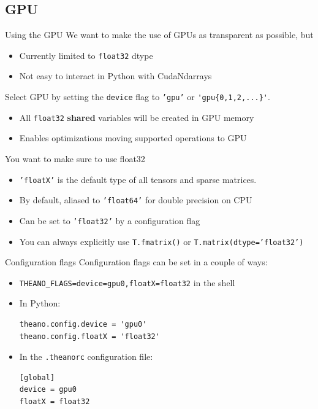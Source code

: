 \documentclass[a4paper,9pt]{beamer}
\begin{document}
\subsection{GPU}
\begin{frame}[fragile]{Using the GPU}
  We want to make the use of GPUs as transparent as possible, but
  \begin{itemize}
    \item Currently limited to {\tt float32} dtype
    \item Not easy to interact in Python with CudaNdarrays
  \end{itemize}
  Select GPU by setting the {\tt device} flag to {\tt 'gpu'} or \verb|'gpu{0,1,2,...}'|.
  \begin{itemize}
    \item All \verb|float32| {\bf shared} variables will be created in GPU memory
    \item Enables optimizations moving supported operations to GPU
  \end{itemize}
  You want to make sure to use float32
  \begin{itemize}
    \item {\tt 'floatX'} is the default type of all tensors and sparse matrices.
    \item By default, aliased to {\tt 'float64'} for double precision on CPU
    \item Can be set to {\tt 'float32'} by a configuration flag
    \item You can always explicitly use {\tt T.fmatrix()} or {\tt T.matrix(dtype='float32')}
  \end{itemize}
\end{frame}

\begin{frame}[fragile]{Configuration flags}
  Configuration flags can be set in a couple of ways:
  \begin{itemize}
    \item \verb|THEANO_FLAGS=device=gpu0,floatX=float32| in the shell
    \item In Python:
      \begin{verbatim}
theano.config.device = 'gpu0'
theano.config.floatX = 'float32'
      \end{verbatim}
    \item In the \verb|.theanorc| configuration file:
      \begin{verbatim}
[global]
device = gpu0
floatX = float32
      \end{verbatim}
  \end{itemize}
\end{frame}
\end{document}

